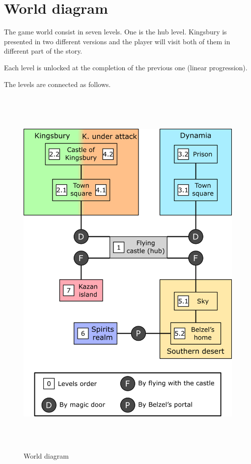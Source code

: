 \pagebreak %

\section{World diagram}

The game world consist in seven levels. One is the hub level. Kingsbury is presented in two different versions and the player will visit both of them in different part of the story.

Each level is unlocked at the completion of the previous one (linear progression).

The levels are connected as follows.

\begin{figure}[H]
  \centering
  \includegraphics[height=19cm]{Images/Diagrams/worldDiagram}
  \caption{World diagram}
\end{figure}
